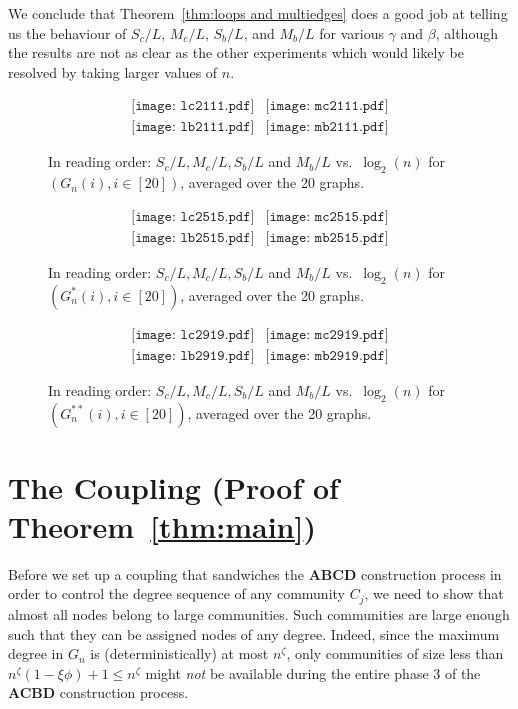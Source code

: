 \documentclass[12pt]{article}
\theoremstyle{definition}
\theoremstyle{remark}
\theoremstyle{remark}
\numberwithin{theorem}{section}
\begin{document}
We conclude that Theorem~\ref{thm:loops and multiedges} does a good job at telling us the behaviour of $S_c/L$, $M_c/L$, $S_b/L$, and $M_b/L$ for various $\gamma$ and $\beta$, although the results are not as clear as the other experiments which would likely be resolved by taking larger values of $n$. 


\begin{figure}
\[
\begin{array}{cc}
\texttt{[image: lc2111.pdf]}
&
\texttt{[image: mc2111.pdf]}\\
\texttt{[image: lb2111.pdf]}
&
\texttt{[image: mb2111.pdf]}
\end{array}
\]
\caption{\label{fig:collisions2111}In reading order: $S_c/L,M_c/L,S_b/L$ and $M_b/L$ vs.\ $\log_2(n)$ for $(G_n(i), i \in [20])$, averaged over the 20 graphs.}
\end{figure}

\begin{figure}
\[
\begin{array}{cc}
\texttt{[image: lc2515.pdf]}
&
\texttt{[image: mc2515.pdf]}\\
\texttt{[image: lb2515.pdf]}
&
\texttt{[image: mb2515.pdf]}
\end{array}
\]
\caption{\label{fig:collisions2515}In reading order: $S_c/L,M_c/L,S_b/L$ and $M_b/L$ vs.\ $\log_2(n)$ for $(G_n^*(i), i \in [20])$, averaged over the 20 graphs.} 
\end{figure}

\begin{figure}
\[
\begin{array}{cc}
\texttt{[image: lc2919.pdf]}
&
\texttt{[image: mc2919.pdf]}\\
\texttt{[image: lb2919.pdf]}
&
\texttt{[image: mb2919.pdf]}
\end{array}
\]
\caption{\label{fig:collisions2919}In reading order: $S_c/L,M_c/L,S_b/L$ and $M_b/L$ vs.\ $\log_2(n)$ for $(G_n^{**}(i), i \in [20])$, averaged over the 20 graphs.}
\end{figure}

\section{The Coupling (Proof of Theorem~\ref{thm:main})}\label{sec:coupling}

Before we set up a coupling that sandwiches the \textbf{ABCD} construction process in order to control the degree sequence of any community $C_j$, we need to show that almost all nodes belong to large communities. Such communities are large enough such that they can be assigned nodes of any degree. Indeed, since the maximum degree in $G_n$ is (deterministically) at most $n^{\zeta}$, only communities of size less than $n^{\zeta} (1-\xi \phi) + 1 \le n^{\zeta}$ might \emph{not} be available during the entire phase 3 of the \textbf{ACBD} construction process.
\end{document}
